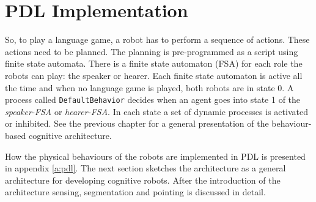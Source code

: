 \section{PDL Implementation}

So, to play a language game, a robot has to perform a sequence of actions. These actions need to be planned. The planning is pre-programmed as a script using finite state automata. There is a finite state automaton (FSA) for each role the robots can play: the speaker or hearer. Each finite state automaton is active all the time and when no language game is played, both robots are in state 0. A process called \texttt{DefaultBehavior} decides when an agent goes into state 1 of the {\em speaker-FSA} or {\em hearer-FSA}. In each state a set of dynamic processes is activated or inhibited. See the previous chapter for a general presentation of the behaviour-based cognitive architecture.

How the physical behaviours of the robots are implemented in PDL is presented in appendix \ref{a:pdl}. The next section sketches the architecture as a general architecture for developing cognitive robots. After the introduction of the architecture sensing, segmentation and pointing is discussed in detail.

